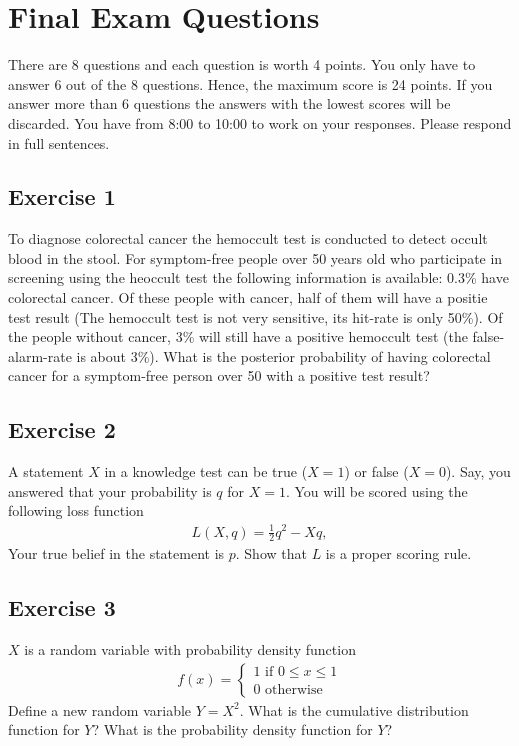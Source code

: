\documentclass[../main/Notes.tex]{subfiles}
\begin{document}
\section{Final Exam Questions}
There are 8 questions and each question is worth 4 points. You only have to answer 6 out of the 8 questions. Hence, the maximum score is 24 points. If you answer more than 6 questions the answers with the lowest scores will be discarded. You have from 8:00 to 10:00 to work on your responses. Please respond in full sentences.


\subsection*{Exercise 1}
To diagnose colorectal cancer the hemoccult test is conducted to detect occult blood in the stool. For symptom-free people over 50 years old who participate in screening using the heoccult test the following information is available: 0.3\% have colorectal cancer. Of these people with cancer, half of them will have a positie test result (The hemoccult test is not very sensitive, its hit-rate is only 50\%). Of the people without cancer, 3\% will still have a positive hemoccult test (the false-alarm-rate is about 3\%). What is the posterior probability of having colorectal cancer for a symptom-free person over 50 with a positive test result?


\subsection*{Exercise 2}
A statement $X$ in a knowledge test can be true ($X=1$) or false ($X=0$). Say, you answered that your probability is $q$ for $X=1$. You will be scored using the following loss function
\begin{align*}
L(X,q) = \frac{1}{2}q^2-Xq,
\end{align*}
Your true belief in the statement is $p$. Show that $L$ is a proper scoring rule.


\subsection*{Exercise 3}
$X$ is a random variable with probability density function
\begin{align*}
f(x) = \begin{cases}
1 \text{ if } 0 \leq x \leq 1 \\
0 \text{ otherwise}
\end{cases}
\end{align*}
Define a new random variable $Y = X^2$. What is the cumulative distribution function for $Y$? What is the probability density function for $Y$?
\end{document}
